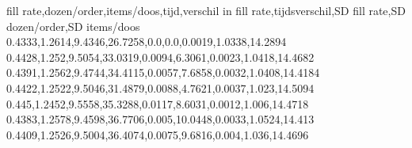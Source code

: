 fill rate,dozen/order,items/doos,tijd,verschil in fill rate,tijdsverschil,SD fill rate,SD dozen/order,SD items/doos
0.4333,1.2614,9.4346,26.7258,0.0,0.0,0.0019,1.0338,14.2894
0.4428,1.252,9.5054,33.0319,0.0094,6.3061,0.0023,1.0418,14.4682
0.4391,1.2562,9.4744,34.4115,0.0057,7.6858,0.0032,1.0408,14.4184
0.4422,1.2522,9.5046,31.4879,0.0088,4.7621,0.0037,1.023,14.5094
0.445,1.2452,9.5558,35.3288,0.0117,8.6031,0.0012,1.006,14.4718
0.4383,1.2578,9.4598,36.7706,0.005,10.0448,0.0033,1.0524,14.413
0.4409,1.2526,9.5004,36.4074,0.0075,9.6816,0.004,1.036,14.4696
